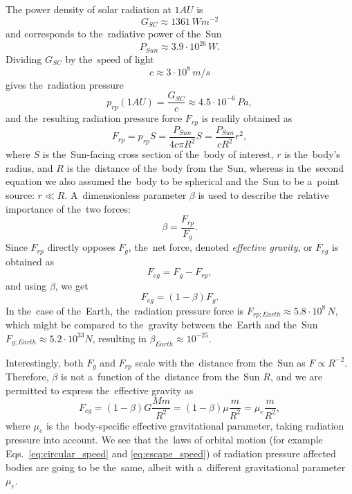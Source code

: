 The power density of solar radiation at $1 \si{AU}$ is \citep{kopp2011new}
\begin{equation}
    G_{SC} \approx 1361 \, \si{W m^{-2}}
\end{equation} 
and corresponds to the~radiative power of the~Sun 
\begin{equation}
    P_{Sun} \approx 3.9 \cdot 10^{26} \, \si{W}.
\end{equation}
Dividing $G_{SC}$ by the~speed of light
\begin{equation}
    c \approx 3\cdot10^8 \, \si{m/s}
\end{equation}
gives the~radiation pressure
\begin{equation}
    p_{rp}(1 \si{AU}) = \frac{G_{SC}}{c} \approx 4.5 \cdot 10^{-6} \, \si{Pa},
    \label{eq:radiation_pressure}
\end{equation}
and the~resulting radiation pressure force $F_{rp}$ is readily obtained as
\begin{equation}
    F_{rp} = p_{rp} S = \frac{P_{Sun}}{4 c \pi R^2} S = \frac{P_{Sun}}{cR^2} r^2, \label{eq:radiation_pressure_force}
\end{equation}
where $S$ is the~Sun-facing cross section of the~body of interest, $r$ is the~body's radius, and $R$ is the~distance of the~body from the~Sun, whereas in the~second equation we also assumed the~body to be spherical and the~Sun to be a~point source: $r \ll R$. A~dimensionless parameter $\beta$ is used to describe the~relative importance of the~two forces:
\begin{equation}
    \beta = \frac{F_{rp}}{F_g}.
\end{equation}
Since $F_{rp}$ directly opposes $F_g$, the~net force, denoted \textit{effective gravity}, or $F_{eg}$ is obtained as
\begin{equation}
    F_{eg} = F_g - F_{rp},
\end{equation}
and using $\beta$, we get
\begin{equation}
    F_{eg} = (1-\beta) F_g.
\end{equation}
In the~case of the~Earth, the~radiation pressure force is $F_{rp;Earth} \approx 5.8 \cdot 10^8 \, \si{N}$, which might be compared to the~gravity between the~Earth and the~Sun $F_{g;Earth} \approx 5.2 \cdot 10^{33} \si{N}$, resulting in $\beta_{Earth} \approx 10^{-25}$. 

Interestingly, both $F_g$ and $F_{rp}$ scale with the~distance from the~Sun as $F \propto {R^{-2}}$. Therefore, $\beta$ is not a~function of the~distance from the~Sun $R$, and we are permitted to express the~effective gravity as 
\begin{equation}
    F_{eg} = (1-\beta) G \frac{M m}{R^2} = (1-\beta) \mu \frac{m}{R^2} = \mu_{e} \frac{m}{R^2},
    \label{eq:effective_gravity}
\end{equation}
where $\mu_{e}$ is the~body-specific effective gravitational parameter, taking radiation pressure into account. We see that the~laws of orbital motion (for example Eqs.~\ref{eq:circular_speed} and \ref{eq:escape_speed}) of radiation pressure affected bodies are going to be the~same, albeit with a~different gravitational parameter $\mu_e$.

